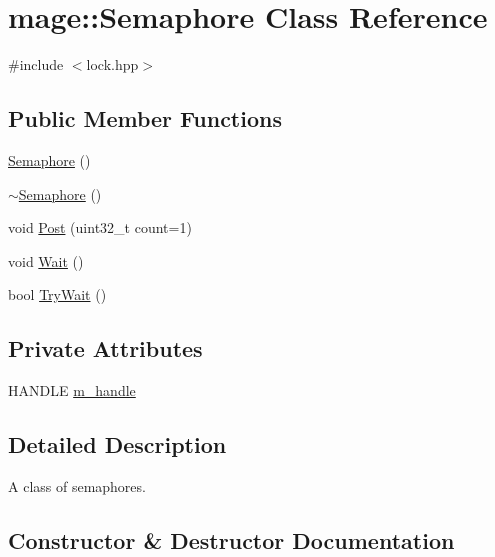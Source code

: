 \hypertarget{classmage_1_1_semaphore}{}\section{mage\+:\+:Semaphore Class Reference}
\label{classmage_1_1_semaphore}


{\ttfamily \#include $<$lock.\+hpp$>$}

\subsection*{Public Member Functions}
\begin{DoxyCompactItemize}
\item 
\hyperlink{classmage_1_1_semaphore_a7b4f53c18b9a244ed98ef58fa5cfa2bb}{Semaphore} ()
\item 
\hyperlink{classmage_1_1_semaphore_a991ed365c28e4a9c63ff34a5efeb012d}{$\sim$\+Semaphore} ()
\item 
void \hyperlink{classmage_1_1_semaphore_a354ea9743f9794b14a3f032e0443b214}{Post} (uint32\+\_\+t count=1)
\item 
void \hyperlink{classmage_1_1_semaphore_ae63599939b6bcc3939cbeddd7ffa5f66}{Wait} ()
\item 
bool \hyperlink{classmage_1_1_semaphore_ab34cdf4e9b7388dbdb30aab167c074f6}{Try\+Wait} ()
\end{DoxyCompactItemize}
\subsection*{Private Attributes}
\begin{DoxyCompactItemize}
\item 
H\+A\+N\+D\+LE \hyperlink{classmage_1_1_semaphore_ac1ded856984b4ac3739d9ff627838fda}{m\+\_\+handle}
\end{DoxyCompactItemize}


\subsection{Detailed Description}
A class of semaphores. 

\subsection{Constructor \& Destructor Documentation}
\hypertarget{classmage_1_1_semaphore_a7b4f53c18b9a244ed98ef58fa5cfa2bb}{}\label{classmage_1_1_semaphore_a7b4f53c18b9a244ed98ef58fa5cfa2bb} 
